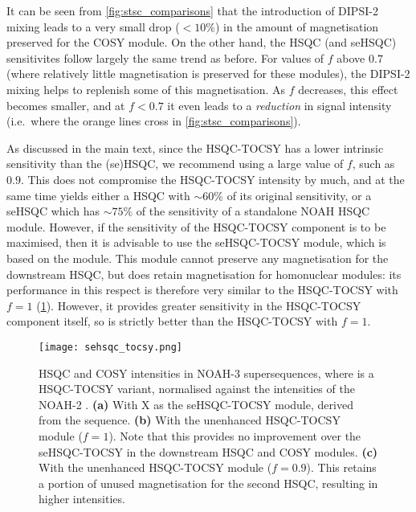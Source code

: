 It can be seen from \cref{fig:stsc_comparisons} that the introduction of DIPSI-2 mixing leads to a very small drop ($< 10\%$) in the amount of  magnetisation preserved for the COSY module.
On the other hand, the HSQC (and seHSQC) sensitivites follow largely the same trend as before.
For values of $f$ above $0.7$ (where relatively little  magnetisation is preserved for these modules), the DIPSI-2 mixing helps to replenish some of this magnetisation.
As $f$ decreases, this effect becomes smaller, and at $f < 0.7$ it even leads to a \textit{reduction} in signal intensity (i.e.\ where the orange lines cross in \cref{fig:stsc_comparisons}).

As discussed in the main text, since the HSQC-TOCSY has a lower intrinsic sensitivity than the (se)HSQC, we recommend using a large value of $f$, such as $0.9$.
This does not compromise the HSQC-TOCSY intensity by much, and at the same time yields either a HSQC with $\sim 60\%$ of its original sensitivity, or a seHSQC which has $\sim 75\%$ of the sensitivity of a standalone NOAH HSQC module.
However, if the sensitivity of the HSQC-TOCSY component is to be maximised, then it is advisable to use the seHSQC-TOCSY module, which is based on the \noahSpb{} module.\autocite{Hansen2021}
This module cannot preserve any  magnetisation for the downstream HSQC, but does retain  magnetisation for homonuclear modules: its performance in this respect is therefore very similar to the HSQC-TOCSY with $f = 1$ (\cref{fig:sehsqc_tocsy}).
However, it provides greater sensitivity in the HSQC-TOCSY component itself, so is strictly better than the HSQC-TOCSY with $f = 1$.

\begin{figure}
    \centering
    \texttt{[image: sehsqc\_tocsy.png]}
    \caption{
        HSQC and COSY intensities in NOAH-3  supersequences, where \noahX{} is a HSQC-TOCSY variant, normalised against the intensities of the NOAH-2 .
        \textbf{(a)} With X as the seHSQC-TOCSY module, derived from the \noahSpb{} sequence.
        \textbf{(b)} With the unenhanced HSQC-TOCSY module ($f = 1$). Note that this provides no improvement over the seHSQC-TOCSY in the downstream HSQC and COSY modules.
        \textbf{(c)} With the unenhanced HSQC-TOCSY module ($f = 0.9$). This retains a portion of unused  magnetisation for the second HSQC, resulting in higher intensities.
        \andro{}
    }
    \label{fig:sehsqc_tocsy}
\end{figure}

